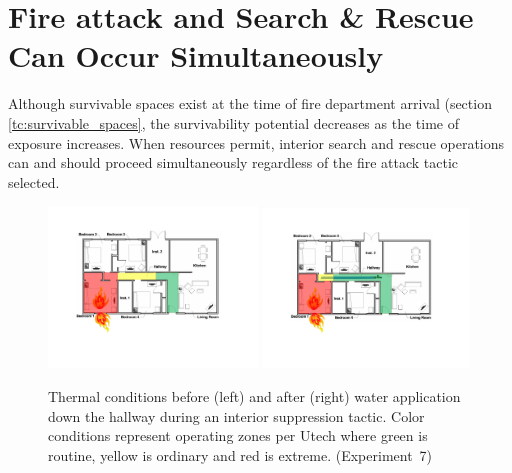 \documentclass[12pt,oneside]{book}
\begin{document}
\section{Fire attack and Search \& Rescue Can Occur Simultaneously} \label{tc:search_during_fire_attack}
Although survivable spaces exist at the time of fire department arrival (section \ref{tc:survivable_spaces}, the survivability potential decreases as the time of exposure increases. When resources permit, interior search and rescue operations can and should proceed simultaneously regardless of the fire attack tactic selected.

\begin{figure}[H]
\centering
\includegraphics[width=0.495\textwidth]{../0_Images/Tactical_Considerations/Similtanious_Search/Interior_Pre}
\includegraphics[width=0.49\textwidth]{../0_Images/Tactical_Considerations/Similtanious_Search/Interior_Post}
\caption[Thermal Conditions - Simultaneous Search - Interior]{Thermal conditions before (left) and after (right) water application down the hallway during an interior suppression tactic. Color conditions represent operating zones per Utech \cite{Utech_Firefighter_Clothing} where green is routine, yellow is ordinary and red is extreme. (Experiment~7)}
\label{fig:similatnious_search_tc_interior}
\end{figure}
\end{document}
